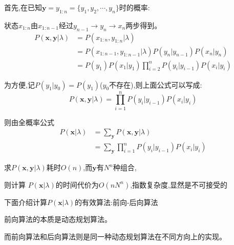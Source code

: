 \documentclass[UTF8,a4paper]{ctexart}%
\begin{document}
            首先,在已知$\bm{y} = y_{1:n} = \{y_1, y_2 , \cdots , y_n \}$时的概率:

            {\color{blue}
              状态$x_{1:n}$由$x_{1:n-1}$经过$y_{n-1}\to y_{n} \to x_{n}$两步得到。
            }
            \begin{equation}\begin{split}
              P(\bm{x,y}|\lambda) &= P(x_{1:n},y_{1:n} | \lambda)\\
              &= P(x_{1:n-1},y_{1:n-1} | \lambda)P(y_{n}|y_{n-1})P(x_n|y_{n})\\
              &= P(y_1)P(x_1|y_1)\prod_{i = 2}^n P(y_{i}|y_{i-1})P(x_i|y_{i})
            \end{split}\end{equation}

            为方便,记$P(y_1|y_0) = P(y_1)$($y_0$不存在),则上面公式可以写成:
            \begin{equation}
              P(\bm{x,y}|\lambda) = \prod_{i = 1}^n P(y_{i}|y_{i-1})P(x_i|y_{i})
            \end{equation}

            则由全概率公式
            \begin{equation}\begin{split}
                P(\bm{x}|\lambda) &= \sum_{\bm{y}}P(\bm{x,y}|\lambda) \\
                &= \sum_{\bm{y}} \prod_{i = 1}^n P(y_{i}|y_{i-1})P(x_i|y_{i})
            \end{split}\end{equation}

            求$P(\bm{x,y}|\lambda)$耗时$O(n)$,而$\bm{y}$有$N^n$种组合,

            则计算 $P(\bm{x}|\lambda)$的时间代价为{\color{red}$O(nN^n)$},指数复杂度,显然是不可接受的

            下面介绍计算$P(\bm{x}|\lambda)$的有效算法:前向-后向算法

            {\color{blue}
                前向算法的本质是动态规划算法。

                而前向算法和后向算法则是同一种动态规划算法在不同方向上的实现。
            }
\end{document}
